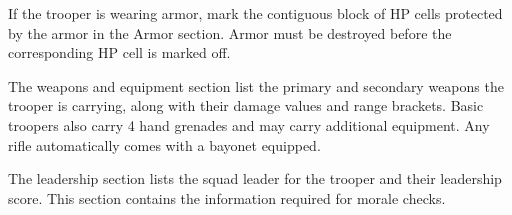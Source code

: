 If the trooper is wearing armor, mark the contiguous block of HP cells protected by the armor in the Armor section.
Armor must be destroyed before the corresponding HP cell is marked off.

The weapons and equipment section list the primary and secondary weapons the trooper is carrying, along with their damage values and range brackets.
Basic troopers also carry 4 hand grenades and may carry additional equipment.
Any rifle automatically comes with a bayonet equipped.

The leadership section lists the squad leader for the trooper and their leadership score.
This section contains the information required for morale checks.
